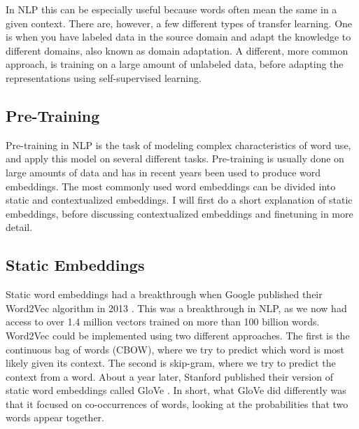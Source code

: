 \documentclass{report}
\begin{document}
In NLP this can be especially useful because words often mean the same in a given context. There are, however, a few different types of transfer learning. One is when you have labeled data in the source domain and adapt the knowledge to different domains, also known as domain adaptation. A different, more common approach, is training on a large amount of unlabeled data, before adapting the representations using self-supervised learning.
\subsection{Pre-Training}
\noindent
Pre-training in NLP is the task of modeling complex characteristics of word use, and apply this model on several different tasks. %
Pre-training is usually done on large amounts of data and has in recent years been used to produce word embeddings. The most commonly used word embeddings can be divided into static and contextualized embeddings. I will first do a short explanation of static embeddings, before discussing contextualized embeddings and finetuning in more detail.
\subsection{Static Embeddings}
Static word embeddings had a breakthrough when Google published their Word2Vec algorithm in 2013 \cite{mikolov2013efficient}. This was a breakthrough in NLP, as we now had access to over 1.4 million vectors trained on more than 100 billion words. Word2Vec could be implemented using two different approaches. The first is the continuous bag of words (CBOW), where we try to predict which word is most likely given its context. The second is skip-gram, where we try to predict the context from a word. About a year later, Stanford published their version of static word embeddings called GloVe \cite{pennington2014glove}. In short, what GloVe did differently was that it focused on co-occurrences of words, looking at the probabilities that two words appear together.
\end{document}
